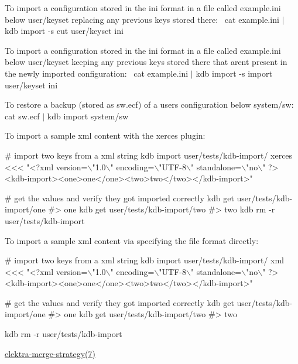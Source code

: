 To import a configuration stored in the {\ttfamily ini} format in a file called {\ttfamily example.\+ini} below {\ttfamily user/keyset} replacing any previous keys stored there\+:~\newline
 {\ttfamily cat example.\+ini $\vert$ kdb import -\/s cut user/keyset ini}

To import a configuration stored in the {\ttfamily ini} format in a file called {\ttfamily example.\+ini} below {\ttfamily user/keyset} keeping any previous keys stored there that aren\textquotesingle{}t present in the newly imported configuration\+:~\newline
 {\ttfamily cat example.\+ini $\vert$ kdb import -\/s import user/keyset ini}

To restore a backup (stored as {\ttfamily sw.\+ecf}) of a user\textquotesingle{}s configuration below {\ttfamily system/sw}\+:~\newline
 {\ttfamily cat sw.\+ecf $\vert$ kdb import system/sw}

To import a sample {\ttfamily xml} content with the {\ttfamily xerces} plugin\+:


\begin{DoxyCode}
# import two keys from a xml string
kdb import user/tests/kdb-import/ xerces <<< "<?xml version=\(\backslash\)"1.0\(\backslash\)" encoding=\(\backslash\)"UTF-8\(\backslash\)" standalone=\(\backslash\)"no\(\backslash\)"
       ?><kdb-import><one>one</one><two>two</two></kdb-import>"

# get the values and verify they got imported correctly
kdb get user/tests/kdb-import/one
#> one
kdb get user/tests/kdb-import/two
#> two
kdb rm -r user/tests/kdb-import
\end{DoxyCode}


To import a sample {\ttfamily xml} content via specifying the file format directly\+:


\begin{DoxyCode}
# import two keys from a xml string
kdb import user/tests/kdb-import/ xml <<< "<?xml version=\(\backslash\)"1.0\(\backslash\)" encoding=\(\backslash\)"UTF-8\(\backslash\)" standalone=\(\backslash\)"no\(\backslash\)"
       ?><kdb-import><one>one</one><two>two</two></kdb-import>"

# get the values and verify they got imported correctly
kdb get user/tests/kdb-import/one
#> one
kdb get user/tests/kdb-import/two
#> two

kdb rm -r user/tests/kdb-import
\end{DoxyCode}



\begin{DoxyItemize}
\item \hyperlink{doc_help_elektra-merge-strategy_md}{elektra-\/merge-\/strategy(7)} 
\end{DoxyItemize}